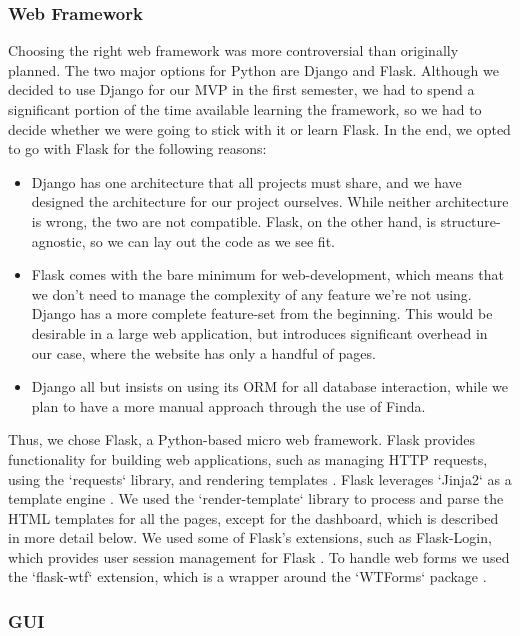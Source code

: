 \documentclass[main.tex]{subfiles}
\begin{document}
\subsubsection{Web Framework}
\label{Web Framework}
Choosing the right web framework was more controversial than originally planned. The two major options for Python are Django and Flask. Although we decided to use Django for our MVP in the first semester, we had to spend a significant portion of the time available learning the framework, so we had to decide whether we were going to stick with it or learn Flask. In the end, we opted to go with Flask for the following reasons:

\begin{itemize}
    \item Django has one architecture that all projects must share, and we have designed the architecture for our project ourselves. While neither architecture is wrong, the two are not compatible. Flask, on the other hand, is structure-agnostic, so we can lay out the code as we see fit.

    \item Flask comes with the bare minimum for web-development, which means that we don't need to manage the complexity of any feature we're not using. Django has a more complete feature-set from the beginning. This would be desirable in a large web application, but introduces significant overhead in our case, where the website has only a handful of pages.

    \item Django all but insists on using its ORM for all database interaction, while we plan to have a more manual approach through the use of Finda.
\end{itemize}

Thus, we chose Flask, a Python-based micro web framework. Flask provides functionality for building web applications, such as managing HTTP requests, using the `requests` library, and rendering templates \cite{smyth_2018}. Flask leverages `Jinja2` as a template engine \cite{templates_2010}. We used the `render-template` library to process and parse the HTML templates for all the pages, except for the dashboard, which is described in more detail below. We used some of Flask's extensions, such as Flask-Login, which provides user session management for Flask \cite{flask-login}. To handle web forms we used the `flask-wtf` extension, which is a wrapper around the `WTForms` package \cite{wtforms-documentation}.

\subsubsection{GUI}
\label{GUI}
\end{document}
